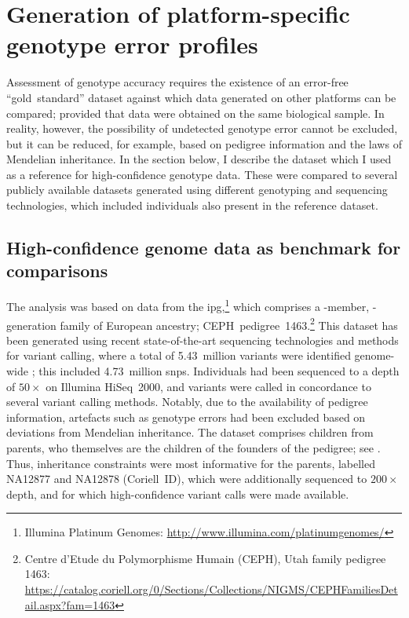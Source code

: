 %
\section{Generation of platform-specific genotype error profiles}
\label{sec:generrprofiles}
%

Assessment of genotype accuracy requires the existence of an error-free ``gold~standard'' dataset against which data generated on other platforms can be compared; provided that data were obtained on the same biological sample.
In reality, however, the possibility of undetected genotype error cannot be excluded, but it can be reduced, for example, based on pedigree information and the laws of Mendelian inheritance.
In the section below, I describe the dataset which I used as a reference for high-confidence genotype data.
These were compared to several publicly available datasets generated using different genotyping and sequencing technologies, which included individuals also present in the reference dataset.

%
\subsection{High-confidence genome data as benchmark for comparisons}
%

The analysis was based on data from the \gls{ipg},\footnote{Illumina Platinum Genomes: \url{http://www.illumina.com/platinumgenomes/} } which comprises a -member, -generation family of European ancestry; CEPH~pedigree~1463.\footnote{Centre d'Etude du Polymorphisme Humain (CEPH), Utah family pedigree 1463: \url{https://catalog.coriell.org/0/Sections/Collections/NIGMS/CEPHFamiliesDetail.aspx?fam=1463} }
This dataset has been generated using recent state-of-the-art sequencing technologies and methods for variant calling, where a total of 5.43~million variants were identified genome-wide \citep{Eberle:2016ki}; this included 4.73~million \glspl{snp}.
Individuals had been sequenced to a depth of ${50\times}$ on Illumina HiSeq~2000, and variants were called in concordance to several variant calling methods.
Notably, due to the availability of pedigree information, artefacts such as genotype errors had been excluded based on deviations from Mendelian inheritance.
The dataset comprises  children from  parents, who themselves are the children of the  founders of the pedigree; see .
Thus, inheritance constraints were most informative for the  parents, labelled \textsf{NA12877} and \textsf{NA12878} (Coriell~ID), which were additionally sequenced to ${200\times}$ depth, and for which high-confidence variant calls were made available.

